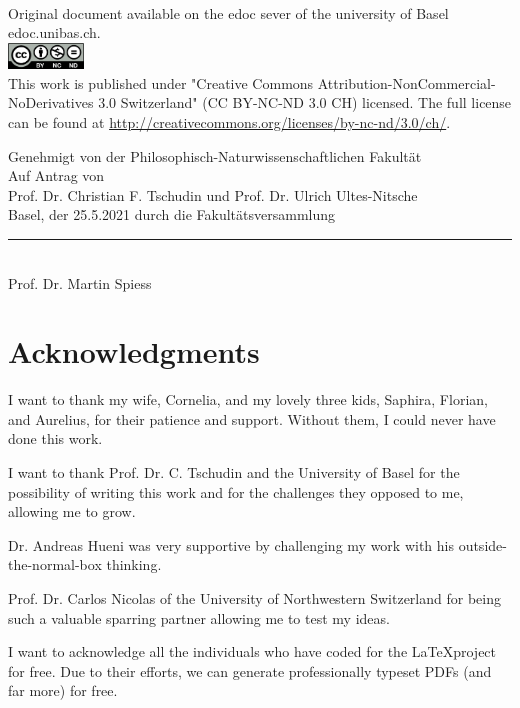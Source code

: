 \begin{titlepage}
\begin{center}
\vfill
{\large \the\year \\[1cm]}
{\footnotesize Original document available on the edoc sever of the university of Basel edoc.unibas.ch.\\[0.5cm]
\includegraphics[height=7mm]{./inc/cclic.png}~\\[0.5cm]
This work is published under  "Creative Commons Attribution-NonCommercial-NoDerivatives 3.0 Switzerland" (CC BY-NC-ND 3.0 CH) licensed. The full license can be found at \url{http://creativecommons.org/licenses/by-nc-nd/3.0/ch/}.
}

\end{center}
\end{titlepage}

\onecolumn
\clearpage\pagestyle{plain}

\begin{center}

Genehmigt von der Philosophisch-Naturwissenschaftlichen Fakult\"at\\
Auf Antrag von\\[0.5cm]
Prof. Dr. Christian F. Tschudin und Prof. Dr. Ulrich Ultes-Nitsche\\[0.5cm]

Basel, der 25.5.2021 durch die Fakultätsversammlung\\[2cm]
{\rule{6cm}{0.2pt}\\ Prof. Dr. Martin Spiess}
\end{center}
\clearpage



\section*{\abstractname}   
\myabstract

\vspace*{\fill}

\section*{Acknowledgments}
I want to thank my wife, Cornelia, and my lovely three kids, Saphira, Florian, and Aurelius, for their patience and support. Without them, I could never have done this work.

I want to thank Prof. Dr. C. Tschudin and the University of Basel for the possibility of writing this work and for the challenges they opposed to me, allowing me to grow. 

Dr. Andreas Hueni was very supportive by challenging my work with his outside-the-normal-box thinking.

Prof. Dr. Carlos Nicolas of the University of Northwestern Switzerland for being such a valuable sparring partner allowing me to test my ideas.

I want to acknowledge all the individuals who have coded for the \LaTeX project for free. Due to their efforts, we can generate professionally typeset PDFs (and far more) for free.





